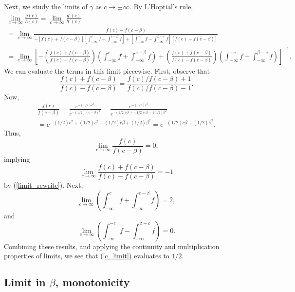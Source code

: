 \documentclass[12pt]{article}
\begin{document}
Next, we study the limits of $\gamma$ as $c \to \pm \infty$. By L'Hoptial's rule, \begin{multline}\label{c_limit} \lim_{c \to \infty} \frac{g(c)}{h(c)} = \lim_{c \to \infty} \frac{g'(c)}{h'(c)} \\ = \lim_{c \to \infty} \frac{ f(c) - f(c - \beta) }{ -[f(c) + f(c - \beta)] \left[\int_{-\infty}^c f + \int_{-\infty}^{c - \beta} f \right] + \left[\int_{-\infty}^{-c} f -\int_{-\infty}^{\beta - c} f \right]\left[ f(c) + f(c - \beta) \right] } \\ = \lim_{c \to \infty} \left[ - \left(\frac{f(c) + f(c - \beta) }{ f(c) -f(c - \beta)} \right) \left( \int_{-\infty}^c f + \int_{-\infty}^{c - \beta} f \right) + \left( \frac{ f(c) + f(c - \beta) }{ f(c) - f(c - \beta) } \right)  \left( \int_{-\infty}^{-c} f - \int_{-\infty}^{\beta - c} f \right)\right]^{-1}.
\end{multline}
We can evaluate the terms in this limit piecewise. First, observe that
\begin{equation}\label{limit_rewrite}
\frac{ f(c) + f(c - \beta) }{ f(c) - f(c - \beta)} = \frac{ f(c)/f(c - \beta) + 1 }{f(c)/f(c - \beta) - 1}.\end{equation} Now,
\begin{multline*}
\frac{ f(c) }{  f(c - \beta) } = \frac{e^{-(1/2) c^2}}{ e^{-(1/2)(c-\beta)^2} } = \frac{ e^{-(1/2)c^2} }{ e^{ -(1/2) c^2 + (1/2)c\beta - (1/2)\beta^2}} \\ = e^{-(1/2)c^2 + (1/2)c^2 -(1/2)c\beta + (1/2)\beta^2} = e^{-(1/2)c\beta + (1/2)\beta^2}.
\end{multline*}
Thus,
$$ \lim_{c \to \infty} \frac{f(c)}{f(c - \beta)} = 0,$$ implying
$$ \lim_{c \to \infty} \frac{ f(c) + f(c - \beta) }{ f(c) - f(c - \beta)} = -1 $$ by (\ref{limit_rewrite}). Next,
$$\lim_{c \to \infty} \left( \int_{-\infty}^c f + \int_{-\infty}^{c - \beta} f \right) = 2,$$ and $$\lim_{c \to \infty}  \left( \int_{-\infty}^{-c} f - \int_{-\infty}^{\beta - c} f \right) = 0.$$
Combining these results, and applying the continuity and multiplication properties of limits, we see that (\ref{c_limit}) evaluates to $1/2.$

\subsection{Limit in $\beta$, monotonicity}
\end{document}
